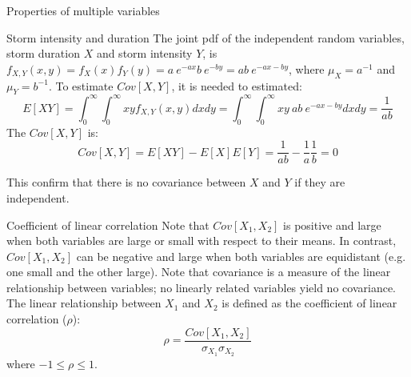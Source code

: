 \documentclass[8pt]{beamer}
\renewcommand{\emph}[1]{\textcolor{myorange}{#1}}
\begin{document}
\begin{frame}{Properties of multiple variables}
    \begin{exampleblock}{Storm intensity and duration}
        The joint \emph{pdf} of the independent random variables, storm duration $X$ and storm intensity $Y$, is $f_{X,Y} (x,y)= f_X (x) f_Y (y) = a \ e^{-ax} b \ e^{-by} = ab \ e^{-ax-by}$, where $\mu_X = a^{-1}$ and $\mu_Y = b^{-1}$. To estimate $Cov[X,Y]$, it is needed to estimated:
        \[
            E[XY] = \int_{0}^{\infty} \int_{0}^{\infty} xy f_{X,Y} (x,y) dx dy = \int_{0}^{\infty} \int_{0}^{\infty} xy \ ab \ e^{-ax - by} dx dy = \frac{1}{ab}
        \]
        The $Cov[X,Y]$ is:
        \vspace{-3pt}
        \[
            Cov[X,Y] = E[XY] - E[X] E[Y] = \frac{1}{ab} - \frac{1}{a}\frac{1}{b} = 0
        \]

        This confirm that there is no covariance between $X$ and $Y$ if they are \emph{independent}.
    \end{exampleblock}
    \begin{block}{Coefficient of linear correlation}
        Note that $Cov[X_1,X_2]$ is positive and large when both variables are large or small with respect to their means. In contrast,  $Cov[X_1,X_2]$ can be negative and large when both variables are equidistant (e.g. one small and the other large). Note that covariance is a measure of the \emph{linear relationship} between variables; no linearly related variables yield no covariance. The linear relationship between $X_1$ and $X_2$ is defined as the \alert{coefficient of linear correlation ($\rho$)}:
    \[
        \rho = \frac{Cov[X_1, X_2]}{\sigma_{X_1} \sigma_{X_2}}
    \]
    where $-1 \leq \rho \leq 1$.
        \end{block}
\end{frame}
\end{document}
